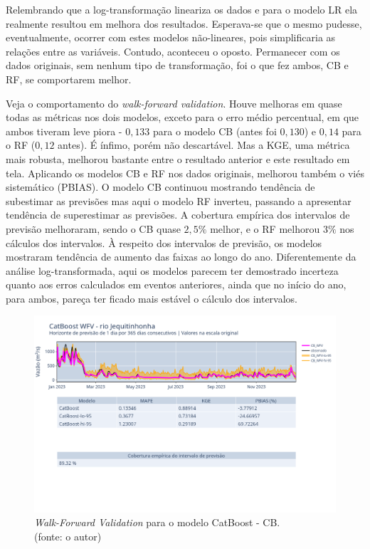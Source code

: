Relembrando que a log-transformação lineariza os dados e para o modelo LR ela realmente resultou em melhora dos resultados. Esperava-se que o mesmo pudesse, eventualmente, ocorrer com estes modelos não-lineares, pois simplificaria as relações entre as variáveis. Contudo, aconteceu o oposto. Permanecer com os dados originais, sem nenhum tipo de transformação, foi o que fez ambos, CB e RF, se comportarem melhor.

Veja o comportamento do \textit{walk-forward validation}. Houve melhoras em quase todas as métricas nos dois modelos, exceto para o erro médio percentual, em que ambos tiveram leve piora - $0,133$ para o modelo CB (antes foi $0,130$) e $0,14$ para o RF ($0,12$ antes). É ínfimo, porém não descartável. Mas a KGE, uma métrica mais robusta, melhorou bastante entre o resultado anterior e este resultado em tela. Aplicando os modelos CB e RF nos dados originais, melhorou também o viés sistemático (PBIAS). O modelo CB continuou mostrando tendência de subestimar as previsões mas aqui o modelo RF inverteu, passando a apresentar tendência de superestimar as previsões. A cobertura empírica dos intervalos de previsão melhoraram, sendo o CB quase $2,5\%$ melhor, e o RF melhorou $3\%$ nos cálculos dos intervalos. À respeito dos intervalos de previsão, os modelos mostraram tendência de aumento das faixas ao longo do ano. Diferentemente da análise log-transformada, aqui os modelos parecem ter demostrado incerteza quanto aos erros calculados em eventos anteriores, ainda que no início do ano, para ambos, pareça ter ficado mais estável o cálculo dos intervalos.

\begin{figure}[!h]
	\centering
	\includegraphics[scale=0.33]{Figuras/jequiti/wfv/CB/CB_WFV_ORIG.png}
	\caption{\textit{Walk-Forward Validation} para o modelo CatBoost - CB.\\(fonte: o autor)}
	\label{fig:jequiti_CB_WFV_ORIG}
\end{figure}

